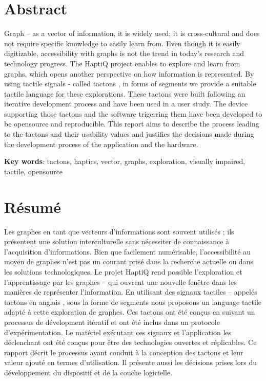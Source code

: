 
\section*{Abstract}
Graph -- as a vector of information, it is widely used; it is cross-cultural and does not require specific knowledge to easily learn from. Even though it is easily digitizable, accessibility with graphs is not the trend in today's research and technology progress. The HaptiQ project enables to explore and learn from graphs, which opens another perspective on how information is represented. By using tactile signals - called tactons \cite{brewster2004tactons}, in forms of segments we provide a suitable tactile language for these explorations. These tactons were built following an iterative development process and have been used in a user study. The device supporting those tactons and the software trigerring them have been developed to be opensource and reproducible.
This report aims to describe the process leading to the tactons and their usability values and justifies the decisions made during the development process of the application and the hardware.

\noindent\textbf{Key words}: tactons, haptics, vector, graphs, exploration, visually impaired, tactile, opensource

\section*{Résumé}
Les graphes en tant que vecteurs d'informations sont souvent utilisés ; ils présentent une solution interculturelle sans nécessiter de connaissance à l'acquisition d'informations. Bien que facilement numérisable, l'accessibilité au moyen de graphes n'est pas un courant prisé dans la recherche actuelle ou dans les solutions technologiques. Le projet HaptiQ rend possible l'exploration et l'apprentissage par les graphes -- qui ouvrent une nouvelle fenêtre dans les manières de représenter l'information. En utilisant des signaux tactiles -- appelés tactons en anglais \cite{brewster2004tactons}, sous la forme de segments nous proposons un language tactile adapté à cette exploration de graphes. Ces tactons ont été conçus en suivant un processus de dévelopment itératif et ont été inclus dans un protocole d'expérimentation. Le matériel exécutant ces signaux et l'application les déclenchant ont été conçus pour être des technologies ouvertes et réplicables.
Ce rapport décrit le processus ayant conduit à la conception des tactons et leur valeur ajouté en termes d'utilisation. Il présente aussi les décisions prises lors du développement du dispositif et de la couche logicielle.
